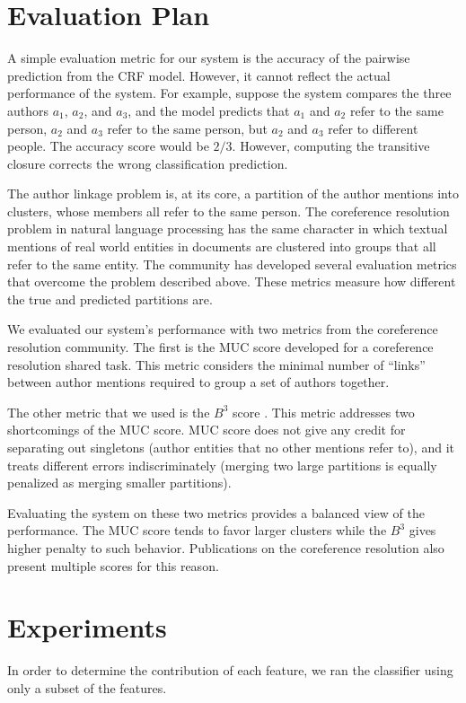 \documentclass[twocolumn,letterpaper]{article}
\begin{document}
\section{Evaluation Plan} %
\label{sec:evaluation}
A simple evaluation metric for our system is the accuracy
of the pairwise prediction from the CRF model.  However, it cannot
reflect the actual performance of the system.  For example, suppose
the system compares the three authors $a_1$, $a_2$, and $a_3$, and the
model predicts that $a_1$ and $a_2$ refer to the same person, $a_2$
and $a_3$ refer to the same person, but $a_2$ and $a_3$ refer to
different people.  The accuracy score would be $2/3$.  However,
computing the transitive closure corrects the wrong classification
prediction.

The author linkage problem is, at its core, a partition of the author
mentions into clusters, whose members all refer to the same person.
The coreference resolution problem in natural language processing has
the same character in which textual mentions of real world entities in
documents are clustered into groups that all refer to the same entity.
The community has developed several evaluation metrics that overcome
the problem described above.  These metrics measure how different the
true and predicted partitions are.

We evaluated our system's performance with two metrics from the
coreference resolution community.  The first is the MUC score
\cite{Vilain95} developed for a coreference resolution shared task.
This metric considers the minimal number of ``links'' between author
mentions required to group a set of authors together.

The other metric that we used is the $B^3$ score \cite{Bagga98b}.
This metric addresses two shortcomings of the MUC score.  MUC score
does not give any credit for separating out singletons (author
entities that no other mentions refer to), and it treats different
errors indiscriminately (merging two large partitions is equally
penalized as merging smaller partitions).

Evaluating the system on these two metrics provides a balanced view of
the performance.  The MUC score tends to favor larger clusters while
the $B^3$ gives higher penalty to such behavior.  Publications on the
coreference resolution also present multiple scores for this reason.

\section{Experiments} %
\label{sec:experiments}
In order to determine the contribution of each feature, we ran the classifier using only a subset of the features.
\end{document}

